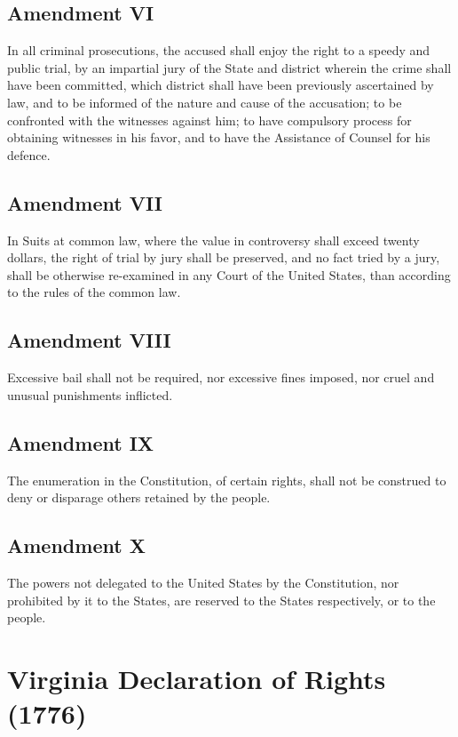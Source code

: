 \documentclass[11pt,a4paper]{article}
\begin{document}
\subsection*{Amendment VI}

In all criminal prosecutions, the accused shall enjoy the right to a speedy and public trial, by an impartial jury of the State and district wherein the crime shall have been committed, which district shall have been previously ascertained by law, and to be informed of the nature and cause of the accusation; to be confronted with the witnesses against him; to have compulsory process for obtaining witnesses in his favor, and to have the Assistance of Counsel for his defence.

\subsection*{Amendment VII}

In Suits at common law, where the value in controversy shall exceed twenty dollars, the right of trial by jury shall be preserved, and no fact tried by a jury, shall be otherwise re-examined in any Court of the United States, than according to the rules of the common law.

\subsection*{Amendment VIII}

Excessive bail shall not be required, nor excessive fines imposed, nor cruel and unusual punishments inflicted.

\subsection*{Amendment IX}

The enumeration in the Constitution, of certain rights, shall not be construed to deny or disparage others retained by the people.

\subsection*{Amendment X}

The powers not delegated to the United States by the Constitution, nor prohibited by it to the States, are reserved to the States respectively, or to the people.


\section*{Virginia Declaration of Rights (1776)}
\end{document}

